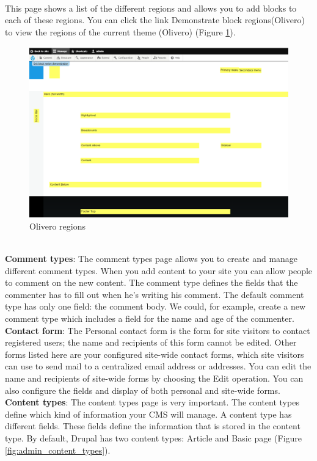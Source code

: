 \\
This page shows a list of the different regions and allows you to add blocks to each of these regions. You can click the link Demonstrate block regions(Olivero) to view the regions of the current theme (Olivero) (Figure \ref{fig:admin_region_demo}).

\begin{figure}[H]
    \centering
    \includegraphics[width=1\linewidth]{img/ch4/admin_region_demo}
    \caption{Olivero regions}
    \label{fig:admin_region_demo}
\end{figure}

\\
\textbf{Comment types}: The comment types page allows you to create and manage different comment types. When you add content to your site you can allow people to comment on the new content. The comment type defines the fields that the commenter has to fill out when he’s writing his comment. The default comment type has only one field: the comment body. We could, for example, create a new comment type which includes a field for the name and age of the commenter.
\\
\textbf{Contact form}: The Personal contact form is the form for site visitors to contact registered users; the name and recipients of this form cannot be edited. Other forms listed here are your configured site-wide contact forms, which site visitors can use to send mail to a centralized email address or addresses. You can edit the name and recipients of site-wide forms by choosing the Edit operation. You can also configure the fields and display of both personal and site-wide forms.
\\
\textbf{Content types}: The content types page is very important. The content types define which kind of information your CMS will manage. A content type has different fields. These fields define the information that is stored in the content type. By default, Drupal has two content types: Article and Basic page (Figure \ref{fig:admin_content_types}).

